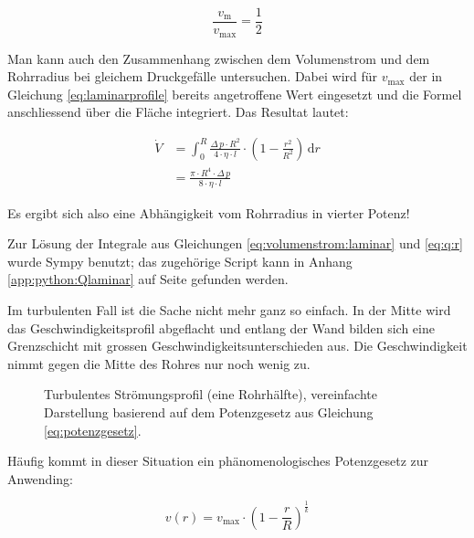 \begin{equation}
    \label{eq:vm_vmax:laminar}
    \frac{v_{\mathrm{m}}}{v_{\mathrm{max}}} = \frac{1}{2}
\end{equation}

Man kann  auch den Zusammenhang  zwischen dem Volumenstrom und  dem Rohrradius
bei gleichem  Druckgef\"alle untersuchen. Dabei wird  f\"ur $v_{\mathrm{max}}$
der in Gleichung \ref{eq:laminarprofile}  bereits angetroffene Wert eingesetzt
und  die Formel  anschliessend  \"uber die  Fl\"ache integriert. Das  Resultat
lautet:

\begin{equation}
    \label{eq:q:r}
    \begin{split}
        \dot{V} &= \int_{0}^R \frac{\Delta\,p \cdot R^2}{4 \cdot \eta \cdot l} \cdot \left( 1 - \frac{r^2}{R^2} \right) \, \mathrm{d}r \\
                &= \frac{\pi \cdot R^4 \cdot \Delta \, p}{8 \cdot \eta \cdot l}
    \end{split}
\end{equation}

Es ergibt sich also eine Abh\"angigkeit vom Rohrradius in vierter Potenz!

Zur L\"osung  der Integrale aus Gleichungen  \ref{eq:volumenstrom:laminar} und
\ref{eq:q:r}  wurde Sympy  benutzt;  das zugeh\"orige  Script  kann in  Anhang
\ref{app:python:Qlaminar}  auf  Seite  \pageref{app:python:Qlaminar}  gefunden
werden.

Im turbulenten  Fall ist die  Sache nicht mehr  ganz so einfach. In  der Mitte
wird  das  Geschwindigkeitsprofil  abgeflacht  und  entlang  der  Wand  bilden
sich  eine  Grenzschicht  mit grossen  Geschwindigkeitsunterschieden  aus. Die
Geschwindigkeit nimmt gegen die Mitte des Rohres nur noch wenig zu.

\begin{figure}[h!t]
    \centering
    \resizebox{0.8\textwidth}{!}{}
    \caption{%
        Turbulentes   Str\"omungsprofil   (eine  Rohrh\"alfte),   vereinfachte
        Darstellung   basierend    auf   dem   Potenzgesetz    aus   Gleichung
        \ref{eq:potenzgesetz}.
    }
    \label{fig:turbProfile}
\end{figure}

H\"aufig kommt  in dieser Situation ein  ph\"anomenologisches Potenzgesetz zur
Anwending:

\begin{equation}
    \label{eq:potenzgesetz}
    v(r) = v_{\mathrm{max}} \cdot \left( 1 - \frac{r}{R} \right)^{\frac{1}{k}}
\end{equation}

